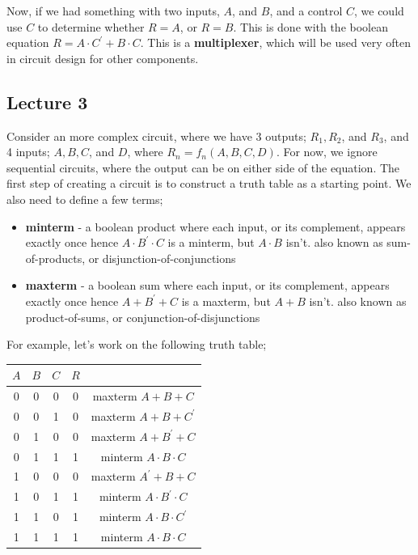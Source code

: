 \documentclass[a4paper, 12pt]{article}
\begin{document}
            Now, if we had something with two inputs, $A$, and $B$, and a control $C$, we could use $C$ to determine whether $R = A$, or $R = B$. This is done with the boolean equation $R = A \cdot C^\prime + B \cdot C$. This is a \textbf{multiplexer}, which will be used very often in circuit design for other components.
        \subsection*{Lecture 3}
            Consider an more complex circuit, where we have 3 outputs; $R_1, R_2$, and $R_3$, and 4 inputs; $A, B, C$, and $D$, where $R_n=f_n(A, B, C, D)$. For now, we ignore sequential circuits, where the output can be on either side of the equation. The first step of creating a circuit is to construct a truth table as a starting point. We also need to define a few terms;
            \begin{itemize}
                \itemsep0em
                \item \textbf{minterm} - a boolean product where each input, or its complement, appears exactly once
                    \subitem hence $A \cdot B^\prime \cdot C$ is a minterm, but $A \cdot B$ isn't.
                    \subitem also known as sum-of-products, or disjunction-of-conjunctions
                \item \textbf{maxterm} - a boolean sum where each input, or its complement, appears exactly once
                    \subitem hence $A + B^\prime + C$ is a maxterm, but $A + B$ isn't.
                    \subitem also known as product-of-sums, or conjunction-of-disjunctions
            \end{itemize}
            For example, let's work on the following truth table;
            \begin{center}
                \begin{tabular}{c|c|c|c|c}
                    $A$ & $B$ & $C$ & $R$ & \\
                    \hline
                    0 & 0 & 0 & 0 & maxterm $A + B + C$ \\
                    0 & 0 & 1 & 0 & maxterm $A + B + C^\prime$ \\
                    0 & 1 & 0 & 0 & maxterm $A + B^\prime + C$ \\
                    0 & 1 & 1 & 1 & minterm $A \cdot B \cdot C$ \\
                    1 & 0 & 0 & 0 & maxterm $A^\prime + B + C$ \\
                    1 & 0 & 1 & 1 & minterm $A \cdot B^\prime \cdot C$ \\
                    1 & 1 & 0 & 1 & minterm $A \cdot B \cdot C^\prime$ \\
                    1 & 1 & 1 & 1 & minterm $A \cdot B \cdot C$
                \end{tabular}
            \end{center}
\end{document}
